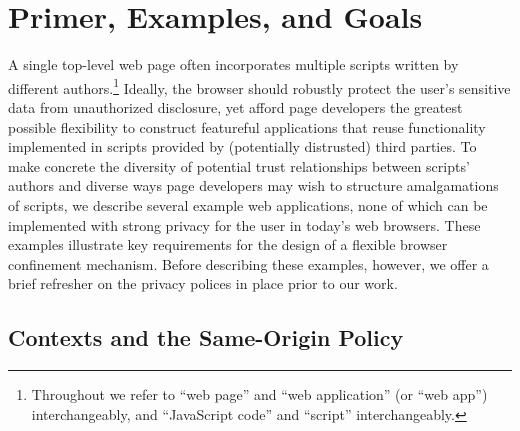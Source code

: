 \section{Primer, Examples, and Goals}

A single top-level web page often incorporates multiple scripts
written by different authors.\footnote{Throughout we refer to ``web
  page'' and ``web application'' (or ``web app'') interchangeably, and
  ``JavaScript code'' and ``script'' interchangeably.} Ideally, the
browser should robustly protect the user's sensitive data from
unauthorized disclosure, yet afford page developers the greatest
possible flexibility to construct featureful applications that
reuse functionality implemented in scripts provided by (potentially
distrusted) third parties. To make concrete the diversity of potential
trust relationships between scripts' authors and diverse ways page
developers may wish to structure amalgamations of scripts, we describe
several example web applications, none of which can be implemented
with strong privacy for the user in today's web browsers. These
examples illustrate key requirements for the design of a flexible
browser confinement mechanism. Before describing these examples,
however, we offer a brief refresher on the privacy polices in place
prior to our work.

\subsection{Contexts and the Same-Origin Policy}
\label{sec:goals}


